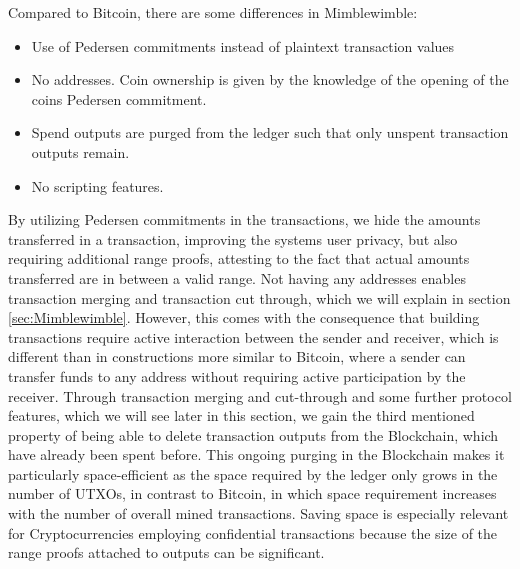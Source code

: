 Compared to Bitcoin, there are some differences in Mimblewimble:
\begin{itemize}
    \item Use of Pedersen commitments instead of plaintext transaction values 
    \item No addresses. Coin ownership is given by the knowledge of the opening of the coins Pedersen commitment. 
    \item Spend outputs are purged from the ledger such that only unspent transaction outputs remain.
    \item No scripting features.
\end{itemize}


By utilizing Pedersen commitments in the transactions, we  hide the amounts transferred in a transaction,
improving the systems user privacy, but also requiring additional range proofs, attesting to the fact that actual amounts transferred are in between a valid range.
Not having any addresses enables transaction merging and transaction cut through,  which we will explain in section \ref{sec:Mimblewimble}.
However, this comes with the consequence that building transactions require active interaction between the sender and receiver,
which is different than in constructions more similar to Bitcoin, where a sender can transfer funds to any address without requiring active participation by the receiver. 
Through transaction merging and cut-through and some further protocol features, which we will see later in this section, we gain the third mentioned property of being able
to delete transaction outputs from the Blockchain, which have already been spent before. This ongoing purging in the Blockchain makes it particularly space-efficient as the
space required by the ledger only grows in the number of UTXOs, in contrast to Bitcoin, in which space requirement increases with the number of overall mined transactions.
Saving space is especially relevant for Cryptocurrencies employing confidential transactions because the size of the range proofs attached to outputs can be significant.

